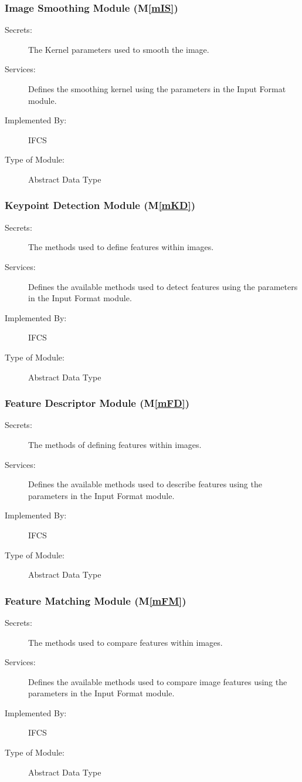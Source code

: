 \documentclass[12pt, titlepage]{article}
\newcommand{\mref}[1]{M\ref{#1}}
\begin{document}
\subsubsection{Image Smoothing Module (\mref{mIS})}
\begin{description}
\item[Secrets:]The Kernel parameters used to smooth the image.
\item[Services:]Defines the smoothing kernel using the parameters in the Input 
Format module.
\item[Implemented By:] IFCS
\item[Type of Module:] Abstract Data Type
\end{description}


\subsubsection{Keypoint Detection Module (\mref{mKD})}
\begin{description}
\item[Secrets:]The methods used to define features within images.
\item[Services:]Defines the available methods used to detect features using the 
parameters in the Input Format module.
\item[Implemented By:] IFCS
\item[Type of Module:] Abstract Data Type
\end{description}

\subsubsection{Feature Descriptor Module (\mref{mFD})}

\begin{description}
\item[Secrets:]The methods of defining features within images.
\item[Services:]Defines the available methods used to describe features using the parameters 
in the Input Format module.
\item[Implemented By:] IFCS
\item[Type of Module:] Abstract Data Type
\end{description}

\subsubsection{Feature Matching Module (\mref{mFM})}
\begin{description}
\item[Secrets:]The methods used to compare features within images.
\item[Services:]Defines the available methods used to compare image features using the 
parameters in the Input Format module.
\item[Implemented By:] IFCS
\item[Type of Module:] Abstract Data Type
\end{description}
\end{document}
